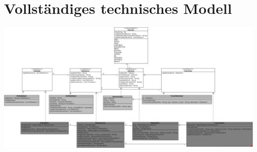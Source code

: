 \newpage
\section{Vollständiges technisches Modell}
\label{anhang:vollständiges_technisches_modell}

\includegraphics[angle=90,height=0.95\textheight]{img/ComplexModel.jpg}



\newpage

